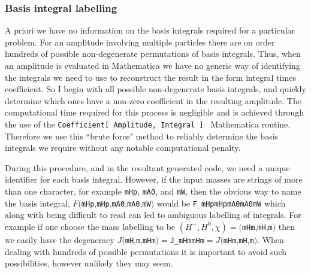 \subsubsection{Basis integral labelling}

A priori we have no information on the basis integrals required for a particular problem.  For an amplitude involving multiple particles there are on order hundreds of possible non-degenerate permutations of basis integrals.  Thus, when an amplitude is evaluated in Mathematica we have no generic way of identifying the integrals we need to use to reconstruct the result in the form integral times coefficient.  So I begin with all possible non-degenerate basis integrals, and quickly determine which ones have a non-zero coefficient in the resulting amplitude.  The computational time required for this process is negligible and is achieved through the use of the \lstinline{Coefficient[ Amplitude, Integral ] } Mathematica routine.  Therefore we use this ``brute force" method to reliably determine the basis integrals we require without any notable computational penalty.

During this procedure, and in the resultant generated \CC code, we need a unique identifier for each basis integral.  However, if the input masses are strings of more than one character, for example \lstinline{mHp}, \lstinline{mA0}, and \lstinline{mW}, then the obvious way to name the basis integral, $F($\lstinline{mHp},\lstinline{mHp},\lstinline{mA0},\lstinline{mA0},\lstinline{mW}$)$ would be \lstinline{F_mHpmHpmA0mA0mW} which along with being difficult to read can led to ambiguous labelling of integrals.  For example if one choose the mass labelling to be $(H^-, H^0, \chi ) = ($\lstinline{mHm},\lstinline{mH},\lstinline{m}$)$ then we easily have the degeneracy $J($\lstinline{mH},\lstinline{m},\lstinline{mHm}$) =  $\lstinline{J_mHmmHm}$ = J($\lstinline{mHm},\lstinline{mH},\lstinline{m}$)$.  When dealing with hundreds of possible permutations it is important to avoid such possibilities, however unlikely they may seem.

